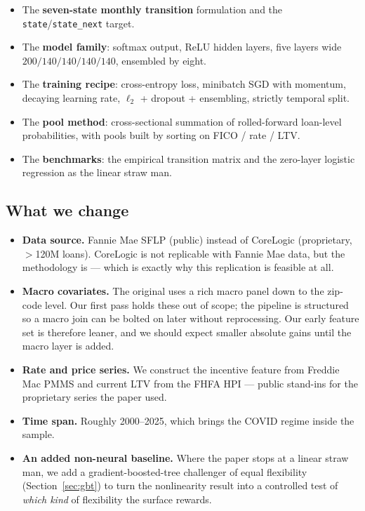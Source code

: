 \documentclass[11pt]{article}
\begin{document}
\begin{itemize}[leftmargin=1.4em, itemsep=2pt]
  \item The \textbf{seven-state monthly transition} formulation and the
        \texttt{state}/\texttt{state\_next} target.
  \item The \textbf{model family}: softmax output, ReLU hidden layers, five layers wide
        $200/140/140/140/140$, ensembled by eight.
  \item The \textbf{training recipe}: cross-entropy loss, minibatch SGD with momentum,
        decaying learning rate, $\ell_2$ + dropout + ensembling, strictly temporal split.
  \item The \textbf{pool method}: cross-sectional summation of rolled-forward loan-level
        probabilities, with pools built by sorting on FICO / rate / LTV.
  \item The \textbf{benchmarks}: the empirical transition matrix and the zero-layer logistic
        regression as the linear straw man.
\end{itemize}

\subsection{What we change}

\begin{itemize}[leftmargin=1.4em, itemsep=2pt]
  \item \textbf{Data source.} Fannie Mae SFLP (public) instead of CoreLogic (proprietary,
        $>$120M loans). CoreLogic is not replicable with Fannie Mae data, but the methodology
        is --- which is exactly why this replication is feasible at all.
  \item \textbf{Macro covariates.} The original uses a rich macro panel down to the zip-code
        level. Our first pass holds these out of scope; the pipeline is structured so a macro
        join can be bolted on later without reprocessing. Our early feature set is therefore
        leaner, and we should expect smaller absolute gains until the macro layer is added.
  \item \textbf{Rate and price series.} We construct the incentive feature from Freddie Mac
        PMMS and current LTV from the FHFA HPI --- public stand-ins for the proprietary series
        the paper used.
  \item \textbf{Time span.} Roughly 2000--2025, which brings the COVID regime inside the
        sample.
  \item \textbf{An added non-neural baseline.} Where the paper stops at a linear straw man, we
        add a gradient-boosted-tree challenger of equal flexibility (Section~\ref{sec:gbt}) to
        turn the nonlinearity result into a controlled test of \emph{which kind} of flexibility
        the surface rewards.
\end{itemize}
\end{document}
